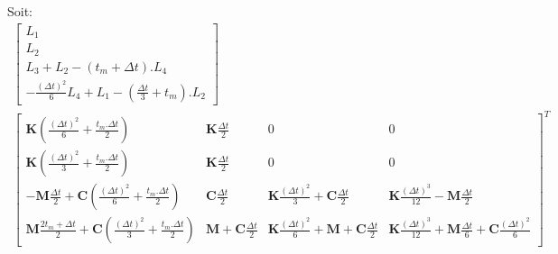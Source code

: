 \documentclass[12pt,a4paper]{report}
\begin{document}
Soit:
\begin{equation}
\!\!\!\!\!\!\!\!\!\!\!\!\!\!\!\!\!\!\!\!\!\!\!\!
\begin{array}{c}
	\begin{bmatrix}	
		  L_1
		\\ L_2
		\\ L_3 + L_2 - (t_m+\Delta t).L_4
		\\  -\frac{(\Delta t)^2}{6} L_4 
			+ L_1 
			- \left( \frac{\Delta t}{3} + t_m \right).L_2
	\end{bmatrix}
	\\
		\begin{bmatrix}	   
			   \mathbf{K}
				   \left( \frac{(\Delta t)^2}{6} + \frac{t_m.\Delta t}{2}
				   \right)
			&
		   		\mathbf{K} \frac{\Delta t}{2}
		   	&   
		   		0
			&
		   		0
		\\   
			   \mathbf{K}
				   \left( \frac{(\Delta t)^2}{3} + \frac{t_m.\Delta t}{2}
				   \right)
			&
		   		\mathbf{K} \frac{\Delta t}{2} 
		   	&
		   		0
			&
		   		0
		\\   
			   -\mathbf{M}
			   		\frac{\Delta t}{2} 
			   +\mathbf{C}
			   		\left( \frac{(\Delta t)^2}{6} 
			   				+ \frac{t_m.\Delta t}{2} \right)  
		   	& 
		   		\mathbf{C} \frac{\Delta t}{2}
		   	&
			   	\mathbf{K}
			   		\frac{(\Delta t)^2}{3} 
		   		+\mathbf{C} \frac{\Delta t}{2}
		   	&
		   		\mathbf{K} \frac{(\Delta t)^3}{12}
		   		-\mathbf{M}
			   		\frac{\Delta t}{2} 
		\\   
			   \mathbf{M}
			   		\frac{2t_m + \Delta t}{2} 
			   +\mathbf{C}
			   		\left( \frac{(\Delta t)^2}{3} 
			   				+ \frac{t_m.\Delta t}{2}\right)
		   	&
			   \mathbf{M} 
			   +\mathbf{C} \frac{\Delta t}{2}
		   	&
		   		\mathbf{K} \frac{(\Delta t)^2}{6} 
		   		+\mathbf{M} 
			   	+\mathbf{C} \frac{\Delta t}{2}
		   	&
		   		\mathbf{K} \frac{(\Delta t)^3}{12}
		   		+\mathbf{M} \frac{\Delta t}{6} 
				+\mathbf{C} \frac{(\Delta t)^2}{6} 
	\end{bmatrix}^T
\end{array}
\end{equation}
\end{document}
